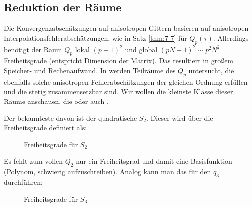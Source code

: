 \subsection{Reduktion der Räume}
\label{sec:reduktion-der-raume}

Die Konvergenzabschätzungen auf anisotropen Gittern basieren auf anisotropen Interpolationsfehlerabschätzungen, wie in Satz \ref{thm:7-7} für $Q_{p}(\tau)$. Allerdings benötigt der Raum $Q_{p}$ lokal $(p+1)^{2}$ und global $(pN+1)^{2} \sim p^{2} N^{2}$ Freiheitsgrade (entspricht Dimension der Matrix). Das resultiert in großem Speicher- und Rechenaufwand. In \cite{FM_ANM} werden Teilräume des $Q_{p}$ untersucht, die ebenfalls solche anisotropen Fehlerabschätzungen der gleichen Ordnung erfüllen und die stetig zusammensetzbar sind. Wir wollen die kleinste Klasse dieser Räume anschauen, die  oder auch . 

Der bekannteste davon ist der quadratische $S_{2}$. Dieser wird über die Freiheitsgrade definiert als:   

\begin{figure}[ht!]
  \centering
  \caption{Freiheitsgrade für $S_2$ }
  \label{fig:s2}
\end{figure}

Es fehlt zum vollen $Q_{2}$ nur ein Freiheitsgrad und damit eine Basisfunktion (Polynom, schwierig aufzuschreiben). Analog kann man das für den $q_{3}$ durchführen:


\begin{figure}[ht!]
  \centering
  \caption{Freiheitsgrade für $S_3$ }
  \label{fig:s3}
\end{figure}


